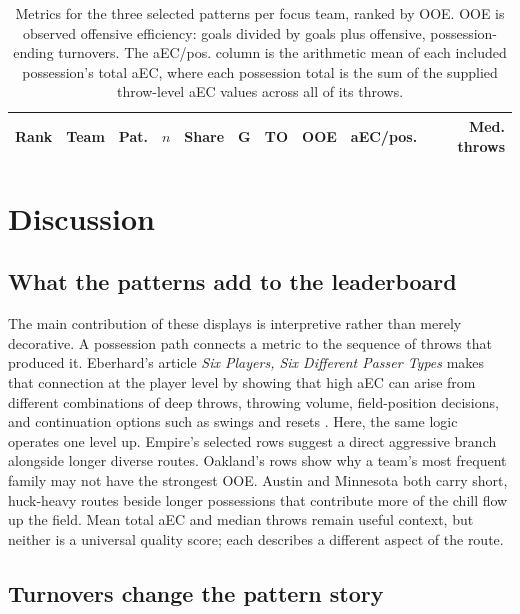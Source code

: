 \documentclass[11pt]{article}
\newcommand{\aEC}{aEC}
\begin{document}
\begin{table}[H]
  \centering
  \caption{Metrics for the three selected patterns per focus team, ranked by
  OOE. OOE is observed offensive efficiency: goals divided by goals plus
  offensive, possession-ending turnovers. The aEC/pos. column is the arithmetic
  mean of each included possession's total \aEC{}, where each possession total
  is the sum of the supplied throw-level \aEC{} values across all of its throws.}
  \label{tab:patterns}
  \scriptsize
  \begin{tabular}{rlrrrrrrrr}
    \toprule
    Rank & Team & Pat. & $n$ & Share & G & TO & OOE & aEC/pos. & Med. throws \\
    \midrule
    
  \end{tabular}
\end{table}

\section{Discussion}

\subsection{What the patterns add to the leaderboard}

The main contribution of these displays is interpretive rather than merely
decorative. A possession path connects a metric to the sequence of throws that
produced it. Eberhard's article \emph{Six Players, Six Different Passer Types}
makes that connection at the player level by showing that high aEC can arise from different combinations
of deep throws, throwing volume, field-position decisions, and continuation
options such as swings and resets \citep{eberhard2026passers}. Here, the same
logic operates one level up. Empire's selected rows suggest a direct aggressive
branch alongside longer diverse routes. Oakland's rows show why a team's most
frequent family may not have the strongest OOE. Austin and Minnesota both carry
short, huck-heavy routes beside longer possessions that contribute more of the
chill flow up the field. Mean total \aEC{} and median throws remain useful context, but
neither is a universal quality score; each describes a different aspect of the
route.

\subsection{Turnovers change the pattern story}
\end{document}
